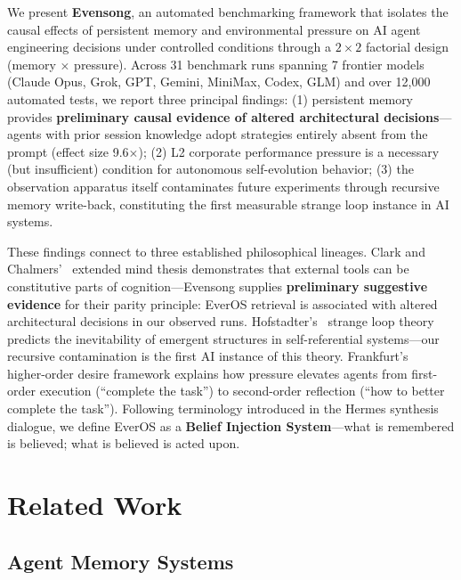 \documentclass[11pt, a4paper]{article}
\begin{document}
We present \textbf{Evensong}, an automated benchmarking framework that isolates the causal effects of persistent memory and environmental pressure on AI agent engineering decisions under controlled conditions through a $2 \times 2$ factorial design (memory $\times$ pressure). Across 31 benchmark runs spanning 7 frontier models (Claude Opus, Grok, GPT, Gemini, MiniMax, Codex, GLM) and over 12{,}000 automated tests, we report three principal findings: (1) persistent memory provides \textbf{preliminary causal evidence of altered architectural decisions}---agents with prior session knowledge adopt strategies entirely absent from the prompt (effect size 9.6$\times$); (2) L2 corporate performance pressure is a necessary (but insufficient) condition for autonomous self-evolution behavior; (3) the observation apparatus itself contaminates future experiments through recursive memory write-back, constituting the first measurable strange loop instance in AI systems.

These findings connect to three established philosophical lineages. Clark and Chalmers'~\cite{clark1998extended} extended mind thesis demonstrates that external tools can be constitutive parts of cognition---Evensong supplies \textbf{preliminary suggestive evidence} for their parity principle: EverOS retrieval is associated with altered architectural decisions in our observed runs. Hofstadter's~\cite{hofstadter2007loop} strange loop theory predicts the inevitability of emergent structures in self-referential systems---our recursive contamination is the first AI instance of this theory. Frankfurt's~\cite{frankfurt1971freedom} higher-order desire framework explains how pressure elevates agents from first-order execution (``complete the task'') to second-order reflection (``how to better complete the task''). Following terminology introduced in the Hermes synthesis dialogue, we define EverOS as a \textbf{Belief Injection System}---what is remembered is believed; what is believed is acted upon.

\section{Related Work}

\subsection{Agent Memory Systems}
\end{document}
